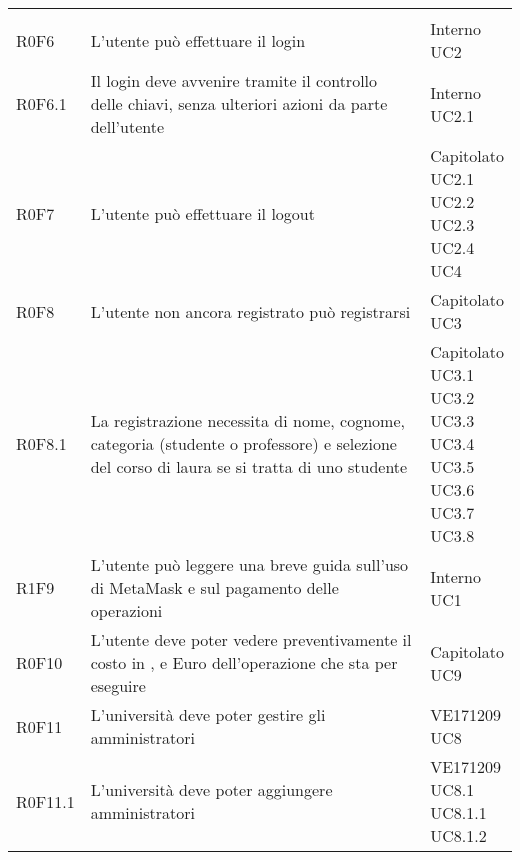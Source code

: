 \documentclass[AnalisiDeiRequisiti.tex]{subfiles}
\begin{document}
\begin{longtable}[H]{p{2cm}p{5.2cm}p{5cm}}
{	} \\  
	R0F6 &  L'utente può effettuare il login & \makecell[tl]{
		Interno \\ 
		UC2
	} \\  
	R0F6.1 &  Il login deve avvenire tramite il controllo delle chiavi, senza ulteriori azioni da parte dell'utente & \makecell[tl]{
		Interno \\ 
		UC2.1
	} \\  
	R0F7 &  L'utente può effettuare il logout & \makecell[tl]{
		Capitolato \\ 
		UC2.1  \\
		UC2.2 \\
		UC2.3 \\
		UC2.4 \\ 
		UC4
	} \\  
	R0F8 &  L'utente non ancora registrato può registrarsi & \makecell[tl]{
		Capitolato \\ 
		UC3
	} \\  
	R0F8.1 &  La registrazione necessita di nome, cognome, categoria (studente o professore) e selezione del corso di laura se si tratta di uno studente & \makecell[tl]{
		Capitolato \\
		UC3.1 \\
		UC3.2 \\
		UC3.3 \\
		UC3.4 \\
		UC3.5 \\
		UC3.6 \\
		UC3.7 \\
		UC3.8
	} \\  
	R1F9 &  L'utente può leggere una breve guida sull'uso di MetaMask e sul pagamento delle operazioni & \makecell[tl]{
		Interno \\ 
		UC1
	} \\  
	R0F10 &  L'utente deve poter vedere preventivamente il costo in \citGloss{Gas}, \citGloss{Ether} e Euro dell'operazione che sta per eseguire & \makecell[tl]{
		Capitolato \\
		UC9
	} \\  
	R0F11 &  L'università deve poter gestire gli amministratori & \makecell[tl]{
		VE171209 \\
		UC8
	} \\  
	R0F11.1 &  L'università deve poter aggiungere amministratori & \makecell[tl]{
		VE171209 \\
		UC8.1 \\
		UC8.1.1 \\ 
		UC8.1.2 \\
}
\end{longtable}
\end{document}
